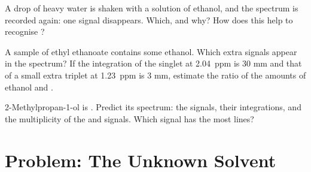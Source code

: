 \begin{exercise}[$\star\star\star$]\label{exo:g12:proton-nmr:13}
A drop of heavy water  is shaken with a solution of ethanol, and
the spectrum is recorded again: one signal disappears. Which, and why?
How does this help to recognise  ?
\end{exercise}

\begin{exercise}[$\star\star\star$]\label{exo:g12:proton-nmr:14}
A sample of ethyl ethanoate contains some ethanol. Which extra signals
appear in the spectrum? If the integration of the singlet at
\qty{2.04}{ppm} is 30 mm and that of a small extra triplet at
\qty{1.23}{ppm} is 3 mm, estimate the ratio of the amounts of ethanol and
.
\end{exercise}

\begin{exercise}[$\star\star\star$]\label{exo:g12:proton-nmr:15}
2-Methylpropan-1-ol is . Predict its spectrum: the
signals, their integrations, and the multiplicity of the  and
 signals. Which signal has the most lines?
\end{exercise}

\section{Problem: The Unknown Solvent}

